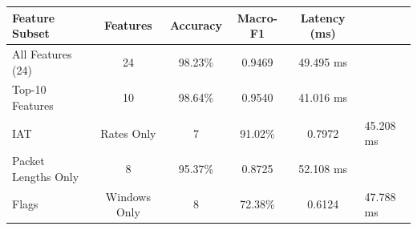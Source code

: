 \begin{tabular}{lcccc}
\hline
Feature Subset & Features & Accuracy & Macro-F1 & Latency (ms) \\
\hline
All Features (24) & 24 & 98.23\% & 0.9469 & 49.495 ms \\
Top-10 Features & 10 & 98.64\% & 0.9540 & 41.016 ms \\
IAT & Rates Only & 7 & 91.02\% & 0.7972 & 45.208 ms \\
Packet Lengths Only & 8 & 95.37\% & 0.8725 & 52.108 ms \\
Flags & Windows Only & 8 & 72.38\% & 0.6124 & 47.788 ms \\
\hline
\end{tabular}

